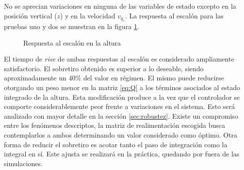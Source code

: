\documentclass[main]{subfiles}
\begin{document}
No se aprecian variaciones en ninguna de las variables de estado excepto en la posici\'on vertical ($z$) y en la velocidad $v_{q_z}$. La respuesta al escal\'on para las pruebas uno y dos se muestran en la figura \ref{fig:hov_esc_z}. 
\begin{figure}
  \centering
  \caption{Respuesta al escal\'on en la altura}
  \label{fig:hov_esc_z}
\end{figure}

El tiempo de \emph{rise} de ambas respuestas al escal\'on es considerado ampliamente satisfactorio. El sobretiro obtenido es superior a lo deseable, siendo aproximadamente un $40\%$ del valor en r\'egimen. El mismo puede reducirse otorgando un peso menor en la matriz \ref{eq:Q} a los t\'erminos asociados al estado integrado de la altura. Esta modificaci\'on produce a la vez que el controlador se comporte considerablemente peor frente a variaciones en el sistema. Esto ser\'a analizado con mayor detalle en la secci\'on \ref{sec:robustez}. Existe un compromiso entre los fen\'omenos descriptos, la matriz de realimentaci\'on escogida busca contemplarlos a ambos determinando un valor considerado como \'optimo. Otra forma de reducir el sobretiro es acotar tanto el paso de integraci\'on como la integral en s\'i. Este ajusta se realizar\'a en la pr\'actica, quedando por fuera de las simulaciones.\\ 
\end{document}
